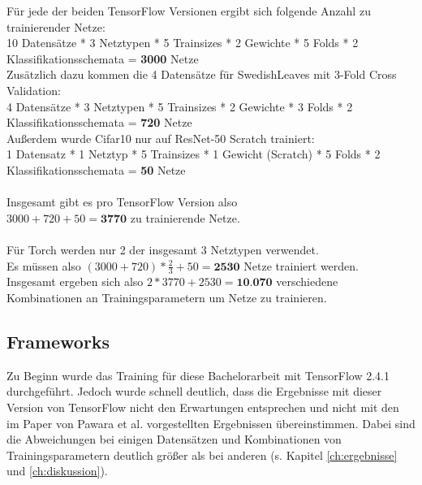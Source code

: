 Für jede der beiden TensorFlow \cite{tensorflow} Versionen ergibt sich folgende Anzahl zu trainierender Netze:\\
\begin{adjustbox}{width=\textwidth, center}
10 Datensätze * 3 Netztypen * 5 Trainsizes * 2 Gewichte * 5 Folds * 2 Klassifikationsschemata = \textbf{3000} Netze\\
\end{adjustbox}
Zusätzlich dazu kommen die 4 Datensätze für SwedishLeaves \cite{swedishLeaves} mit 3-Fold Cross Validation:\\
\begin{adjustbox}{width=\textwidth, center}
4 Datensätze * 3 Netztypen * 5 Trainsizes * 2 Gewichte * 3 Folds * 2 Klassifikationsschemata = \textbf{720} Netze\\
\end{adjustbox}
Außerdem wurde Cifar10 \cite{cifar10} nur auf ResNet-50 Scratch trainiert:\\
\begin{adjustbox}{width=\textwidth, center}
1 Datensatz * 1 Netztyp * 5 Trainsizes * 1 Gewicht (Scratch) * 5 Folds * 2 Klassifikationsschemata = \textbf{50} Netze\\
\end{adjustbox}
\\
Insgesamt gibt es pro TensorFlow \cite{tensorflow} Version also\\
$3000 + 720 + 50 = \textbf{3770}$ zu trainierende Netze.\\\\

Für Torch \cite{pytorch} werden nur 2 der insgesamt 3 Netztypen verwendet.\\
Es müssen also $(3000 + 720) * \frac{2}{3} + 50 = \textbf{2530}$ Netze trainiert werden.\\

Insgesamt ergeben sich also $2 * 3770 + 2530 = \textbf{10.070}$ verschiedene Kombinationen an Trainingsparametern um Netze zu trainieren.

\subsection{Frameworks}
Zu Beginn wurde das Training für diese Bachelorarbeit mit TensorFlow 2.4.1 \cite{tensorflow} durchgeführt. Jedoch wurde schnell deutlich, dass die Ergebnisse mit dieser Version von TensorFlow \cite{tensorflow} nicht den Erwartungen entsprechen und nicht mit den im Paper von Pawara et al. \cite{pawaraPaper} vorgestellten Ergebnissen übereinstimmen. Dabei sind die Abweichungen bei einigen Datensätzen und Kombinationen von Trainingsparametern deutlich größer als bei anderen (s. Kapitel \ref{ch:ergebnisse} und \ref{ch:diskussion}). \\

